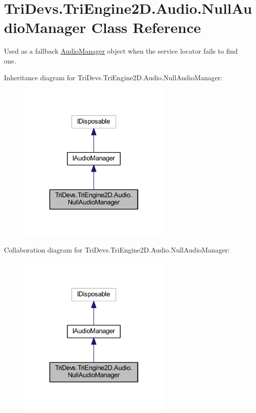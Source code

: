 \hypertarget{class_tri_devs_1_1_tri_engine2_d_1_1_audio_1_1_null_audio_manager}{\section{Tri\-Devs.\-Tri\-Engine2\-D.\-Audio.\-Null\-Audio\-Manager Class Reference}
\label{class_tri_devs_1_1_tri_engine2_d_1_1_audio_1_1_null_audio_manager}
}


Used as a fallback \hyperlink{class_tri_devs_1_1_tri_engine2_d_1_1_audio_1_1_audio_manager}{Audio\-Manager} object when the service locator fails to find one.  




Inheritance diagram for Tri\-Devs.\-Tri\-Engine2\-D.\-Audio.\-Null\-Audio\-Manager\-:
\nopagebreak
\begin{figure}[H]
\begin{center}
\leavevmode
\includegraphics[width=214pt]{class_tri_devs_1_1_tri_engine2_d_1_1_audio_1_1_null_audio_manager__inherit__graph}
\end{center}
\end{figure}


Collaboration diagram for Tri\-Devs.\-Tri\-Engine2\-D.\-Audio.\-Null\-Audio\-Manager\-:
\nopagebreak
\begin{figure}[H]
\begin{center}
\leavevmode
\includegraphics[width=214pt]{class_tri_devs_1_1_tri_engine2_d_1_1_audio_1_1_null_audio_manager__coll__graph}
\end{center}
\end{figure}
